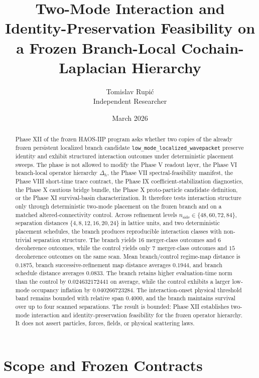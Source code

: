 \documentclass[11pt]{article}
\title{Two-Mode Interaction and Identity-Preservation Feasibility on a Frozen Branch-Local Cochain-Laplacian Hierarchy}
\author{Tomislav Rupi\'c \\ Independent Researcher}
\date{March 2026}
\begin{document}
\maketitle

\begin{abstract}
Phase XII of the frozen HAOS-IIP program asks whether two copies of the already frozen persistent localized branch candidate
\texttt{low\_mode\_localized\_wavepacket} preserve identity and exhibit structured interaction outcomes under deterministic placement sweeps. The phase is not allowed to modify the Phase V readout layer, the Phase VI branch-local operator hierarchy $\Delta_h$, the Phase VII spectral-feasibility manifest, the Phase VIII short-time trace contract, the Phase IX coefficient-stabilization diagnostics, the Phase X cautious bridge bundle, the Phase X proto-particle candidate definition, or the Phase XI survival-basin characterization. It therefore tests interaction structure only through deterministic two-mode placement on the frozen branch and on a matched altered-connectivity control. Across refinement levels $n_{\mathrm{side}}\in\{48,60,72,84\}$, separation distances $\{4,8,12,16,20,24\}$ in lattice units, and two deterministic placement schedules, the branch produces reproducible interaction classes with non-trivial separation structure. The branch yields $16$ merger-class outcomes and $6$ decoherence outcomes, while the control yields only $7$ merger-class outcomes and $15$ decoherence outcomes on the same scan. Mean branch/control regime-map distance is $0.1875$, branch successive-refinement map distance averages $0.1944$, and branch schedule distance averages $0.0833$. The branch retains higher evaluation-time norm than the control by $0.024632172441$ on average, while the control exhibits a larger low-mode occupancy inflation by $0.040266723284$. The interaction-onset physical threshold band remains bounded with relative span $0.4000$, and the branch maintains survival over up to four scanned separations. The result is bounded: Phase XII establishes two-mode interaction and identity-preservation feasibility for the frozen operator hierarchy. It does not assert particles, forces, fields, or physical scattering laws.
\end{abstract}

\section{Scope and Frozen Contracts}
\end{document}
